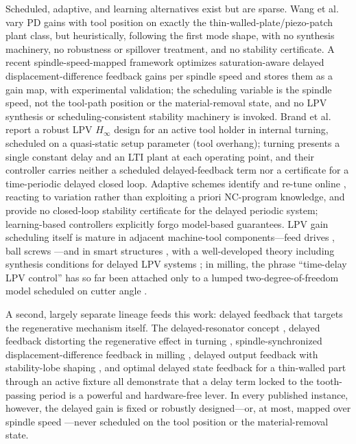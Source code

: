 \documentclass[preprint,12pt]{elsarticle}
\newcommand{\hinf}{H_\infty}
\begin{document}
Scheduled, adaptive, and learning alternatives exist but are sparse.
Wang et al.~\cite{wang2019timespace} vary PD gains with tool position on
exactly the thin-walled-plate/piezo-patch plant class, but heuristically,
following the first mode shape, with no synthesis machinery, no
robustness or spillover treatment, and no stability certificate. A
recent spindle-speed-mapped framework \cite{jmp2026spindle} optimizes
saturation-aware delayed displacement-difference feedback gains per
spindle speed and stores them as a gain map, with experimental
validation; the scheduling variable is the spindle speed, not the
tool-path position or the material-removal state, and no LPV synthesis or
scheduling-consistent stability machinery is invoked. Brand et
al.~\cite{brand2025lpv} report a robust LPV $\hinf$ design for an active
tool holder in internal turning, scheduled on a quasi-static setup
parameter (tool overhang); turning presents a single constant delay and
an LTI plant at each operating point, and their controller carries
neither a scheduled delayed-feedback term nor a certificate for a
time-periodic delayed closed loop. Adaptive schemes identify and re-tune
online \cite{kleinwort2018adaptive,wang2022fft}, reacting to variation
rather than exploiting a priori NC-program knowledge, and provide no
closed-loop stability certificate for the delayed periodic system;
learning-based controllers \cite{nasiri2025chatter} explicitly forgo
model-based guarantees. LPV gain scheduling itself is mature in adjacent
machine-tool components---feed drives \cite{hanifzadegan2015tracking},
ball screws \cite{huang2024polytopic}---and in smart structures
\cite{onat2017gain}, with a well-developed theory
\cite{shamma1991guaranteed,rugh2000research,apkarian1995self,
hoffmann2015survey} including synthesis conditions for delayed LPV
systems \cite{desouza2022gain}; in milling, the phrase ``time-delay LPV
control'' has so far been attached only to a lumped two-degree-of-freedom
model scheduled on cutter angle \cite{wang2015timedelay}.

A second, largely separate lineage feeds this work: delayed feedback that
targets the regenerative mechanism itself. The delayed-resonator concept
\cite{olgac1994delayed,olgac1998new,vyhlidal2019analysis}, delayed
feedback distorting the regenerative effect in turning
\cite{mancisidor2019delayed}, spindle-synchronized displacement-difference
feedback in milling \cite{du2022timedelay,li2022displacement}, delayed
output feedback with stability-lobe shaping \cite{vandijk2015fixed}, and
optimal delayed state feedback for a thin-walled part through an active
fixture \cite{dong2023suppress} all demonstrate that a delay term locked
to the tooth-passing period is a powerful and hardware-free lever. In
every published instance, however, the delayed gain is fixed or robustly
designed---or, at most, mapped over spindle speed
\cite{jmp2026spindle}---never scheduled on the tool position or the
material-removal state.
\end{document}
